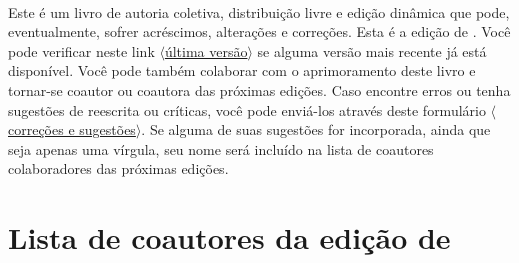 \newpage

\thispagestyle{empty}
\onecolumn
\ 
\vfill

\parbox{3 in}{

Este é um livro de autoria coletiva, distribuição livre e edição dinâmica que pode, eventualmente, sofrer acréscimos, alterações e correções.
Esta é a edição de \mydate.
Você pode verificar neste link
\href{https://github.com/Grupo-de-Estudos-em-Logica-da-UFRN/Para-Todxs-Natal/blob/main/paratodxsnatal.pdf}{$\langle$última versão$\rangle$}
se alguma versão mais recente já está disponível.
Você pode também colaborar com o aprimoramento deste livro e tornar-se coautor ou coautora das próximas edições.
Caso encontre erros ou tenha sugestões de reescrita ou críticas, você pode enviá-los através deste formulário 
\href{https://forms.gle/yd4yH9WAo6TxAiSj8}{$\langle$correções e sugestões$\rangle$}.
Se alguma de suas sugestões for incorporada, ainda que seja apenas uma vírgula, seu nome será incluído na lista de coautores colaboradores das próximas edições. 

}

\newpage

\section{Lista de coautores da edição de \ \mydate}

